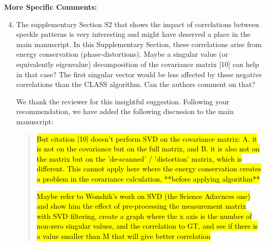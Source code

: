 \documentclass[12pt]{article}
\newcommand{\hlred}[1]{\sethlcolor{red!30}\hl{#1}}
\newenvironment{solved_reviewercomment}
    {\begin{tcolorbox}[width=\linewidth,colback=gray!5,colframe=solved_commentcolor!50,title=Reviewer Comment,left=5pt,right=5pt]}
    {\end{tcolorbox}}
\newenvironment{ourresponse}
    {\begin{tcolorbox}[width=\linewidth,breakable,enhanced,colback=gray!5,colframe=responsecolor!50,title=Response,left=5pt,right=5pt]}
    {\end{tcolorbox}}
\begin{document}
\textbf{More Specific Comments:}
\begin{enumerate}[label=\arabic*.]
    \setcounter{enumi}{3}
    \item  \leavevmode\vspace{-\baselineskip}
    \begin{solved_reviewercomment}
        The supplementary Section S2 that shows the impact of correlations between speckle patterns is very interesting and might have deserved a place in the main manuscript. In this Supplementary Section, these correlations arise from energy conservation (phase-distortions). Maybe a singular value (or equivalently eigenvalue) decomposition of the covariance matrix [10] can help in that case? The first singular vector would be less affected by these negative correlations than the CLASS algorithm. Can the authors comment on that? 
    \end{solved_reviewercomment}
    \begin{ourresponse}

        We thank the reviewer for this insightful suggestion. Following your recommendation, we have added the following discussion to the main manuscript:
        
        \begin{quote}
        \hlred{But citation [10] doesn't perform SVD on the covariance matrix: A. it is not on the covariance but on the full matrix, and B. it is also not on the matrix but on the 'de-scanned' / 'distortion' matrix, which is different. This cannot apply here where the energy conservation creates a problem in the covariance calculation, **before applying algorithm**}
    


        \hlred{Maybe refer to Wonshik's work on SVD (the Science Adavnces one) and show him the effect of pre-processing the measurement matrix with SVD filtering, create a graph where the x axis is the number of non-zero singular values, and the correlation to GT, and see if there is a value smaller than M that will give better correlation}


\end{quote}
\end{ourresponse}
\end{enumerate}
\end{document}
